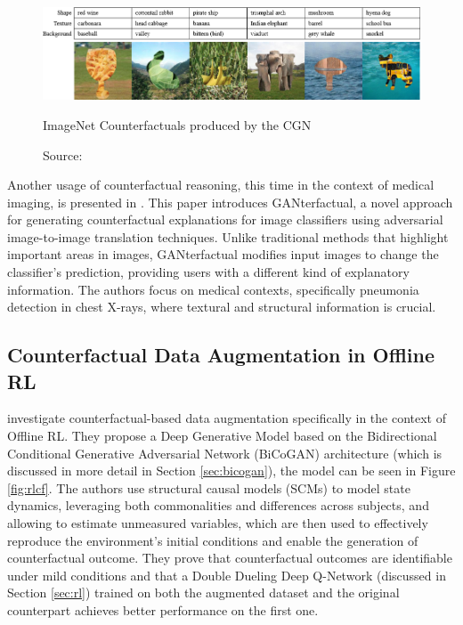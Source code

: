 \begin{figure}[ht]
    \centering
    \includegraphics[width=\textwidth]{figures/ch2/1.ctf2.png}
    \caption{ImageNet Counterfactuals produced by the CGN}
    \vspace{-10px}
    \caption*{\scriptsize{Source: \cite{sauer2021}}}
    \label{fig:ctf}
\end{figure}

Another usage of counterfactual reasoning,
this time in the context of medical imaging,
is presented in \cite{mertes2022}.
This paper introduces GANterfactual,
a novel approach for generating counterfactual
explanations for image classifiers using adversarial
image-to-image translation techniques.
Unlike traditional methods that highlight
important areas in images, GANterfactual
modifies input images to change the
classifier's prediction,
providing users with a different kind
of explanatory information.
The authors focus on medical contexts,
specifically pneumonia detection in chest X-rays,
where textural and structural information is crucial.

\subsection{Counterfactual Data Augmentation in Offline RL}

\cite{lu2020} investigate counterfactual-based
data augmentation
specifically in the context of Offline RL.
They propose a Deep Generative Model based on the
Bidirectional Conditional Generative Adversarial Network
(BiCoGAN) architecture (which is discussed in more detail
in Section \ref{sec:bicogan}), the model
can be seen in Figure \ref{fig:rlcf}.
The authors use structural causal models (SCMs)
to model state dynamics, leveraging both
commonalities and differences across subjects,
and allowing to estimate unmeasured variables,
which are then used to effectively
reproduce the environment’s initial conditions
and enable the
generation of counterfactual outcome.
They prove that counterfactual outcomes are identifiable
under mild conditions and that a Double Dueling
Deep Q-Network (discussed in Section \ref{sec:rl})
trained on both the augmented dataset and the original
counterpart achieves better performance on the first one.


